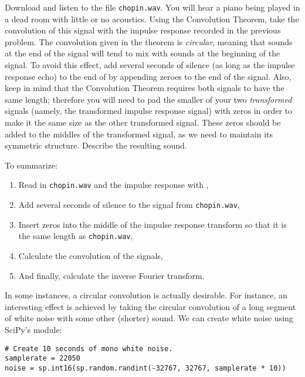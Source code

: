 \begin{problem}\label{convolution_problem}
Download and listen to the file \texttt{chopin.wav}.
You will hear a piano being played in a dead room with little or no acoustics.
Using the Convolution Theorem, take the convolution of this signal with the impulse response recorded in the previous problem.
The convolution given in the theorem is \emph{circular}, meaning that sounds at the end of the signal will tend to mix with sounds at the beginning of the signal.
To avoid this effect, add several seconds of silence (as long as the impulse response echo) to the end of  by appending zeroes to the end of the signal.
Also, keep in mind that the Convolution Theorem requires both signals to have the same length; therefore you will need to pad the smaller of your two \emph{transformed} signals (namely, the transformed impulse response signal) with zeros in order to make it the same size as the other transformed signal.
These zeros should be added to the middles of the transformed signal, as we need to maintain its symmetric structure.
Describe the resulting sound.

To summarize:
\begin{enumerate}

\item Read in \texttt{chopin.wav} and the impulse response with ,
\item Add several seconds of silence to the signal from \texttt{chopin.wav},
\item Insert zeros into the middle of the impulse response transform so that it is the same length as  \texttt{chopin.wav},
\item Calculate the convolution of the signals,
\item And finally, calculate the inverse Fourier transform.
\end{enumerate}

\end{problem}

In some instances, a circular convolution is actually desirable.
For instance, an interesting effect is achieved by taking the circular convolution of a long segment of white noise with some other (shorter) sound.
We can create white noise using SciPy's  module:
\begin{lstlisting}
# Create 10 seconds of mono white noise.
samplerate = 22050
noise = sp.int16(sp.random.randint(-32767, 32767, samplerate * 10))
\end{lstlisting}


